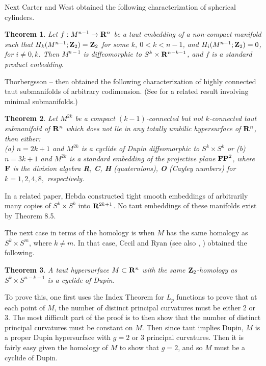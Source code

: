 \documentclass[12pt]{article}
\newtheorem{theorem}{Theorem}[section]
\begin{document}
{Next Carter and West \cite{CW1} obtained the following characterization
of spherical cylinders.
\begin{theorem}
\label{thm:carter-west-non-compact}
Let $f:M^{n-1} \rightarrow {\bf R}^n$ be a taut embedding of a
non-compact manifold such that $H_k(M^{n-1};{\bf Z}_2) = 
{\bf Z}_2$ for some $k,\  0 < k < n-1$, and $H_i(M^{n-1};{\bf Z}_2) = 0$,
for $i \neq 0,k$.  Then $M^{n-1}$ is diffeomorphic to
$S^k \times {\bf R}^{n-k-1}$, and $f$ is a standard product embedding.
\end{theorem}
Thorbergsson \cite{Th3}--\cite{Th4}
then obtained the following characterization of
highly connected taut submanifolds of arbitrary codimension.
(See \cite{JM} for a related result involving minimal submanifolds.)
\begin{theorem}
\label{thm:thorbergsson-highly-connected-taut}
Let $M^{2k}$ be a compact $(k-1)$-connected but not $k$-connected
taut submanifold of ${\bf R}^n$ which does not lie in any
totally umbilic hypersurface of ${\bf R}^n$, then either:\\
{\rm (a)} $n = 2k+1$ and $M^{2k}$ is a cyclide of Dupin diffeomorphic
to $S^k \times S^k$ or
{\rm (b)} $n = 3k+1$ and $M^{2k}$ is a standard embedding of the 
projective plane ${\bf FP}^2$, 
where ${\bf F}$ is the division algebra
{\bf R}, {\bf C}, {\bf H} (quaternions),
{\bf O} (Cayley numbers) for $k=1,2,4,8,$ respectively.
\end{theorem}
In a related paper, Hebda \cite{Heb2} constructed tight smooth
embeddings of arbitrarily many copies of $S^k \times S^k$ into
${\bf R}^{2k+1}$.  No taut embeddings of these manifolds
exist by Theorem 8.5.
 
The next case in terms of the homology is when $M$ has
the same homology as $S^k \times S^m$, where $k \neq m$.
In that case, Cecil and Ryan \cite{CRMA} (see also \cite[pp. 202--206]{CR7}, \cite[pp. 332--338]{CR8})
obtained the following.
\begin{theorem}
\label{thm:C-R-taut-product-spheres}
A taut hypersurface $M \subset {\bf R}^n$ with the same
${\bf Z}_2$-homology as $S^k \times S^{n-k-1}$ is a cyclide
of Dupin.
\end{theorem}
To prove this,
one first uses the Index Theorem for $L_p$ functions to prove that
at each point of $M$, the number of distinct principal curvatures
must be either 2 or 3.  The most difficult part of the proof is to then
show that the number of distinct principal curvatures
must be constant on $M$.  Then since taut implies Dupin,
$M$ is a proper Dupin
hypersurface with $g =2$  or 3 principal curvatures.
Then it is fairly easy given the homology of $M$
to show that $g=2$, and so $M$ must be a cyclide of
Dupin.

}
\end{document}
